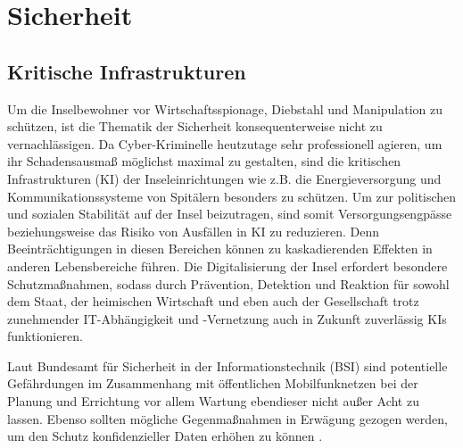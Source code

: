 
%
%
% 
% 
% 

\section{Sicherheit}
\label{sec:sicherheit}
\subsection{Kritische Infrastrukturen}
Um die Inselbewohner vor Wirtschaftsspionage, Diebstahl und Manipulation zu schützen, ist die Thematik der Sicherheit konsequenterweise nicht zu vernachlässigen. Da Cyber-Kriminelle heutzutage sehr professionell agieren, um ihr Schadensausmaß möglichst maximal zu gestalten, sind die kritischen Infrastrukturen (KI) der Inseleinrichtungen wie z.B. die Energieversorgung und Kommunikationssysteme von Spitälern besonders zu schützen. Um zur politischen und sozialen Stabilität auf der Insel beizutragen, sind somit Versorgungsengpässe beziehungsweise das Risiko von Ausfällen in KI zu reduzieren. Denn Beeinträchtigungen in diesen Bereichen können zu kaskadierenden Effekten in anderen Lebensbereiche führen. Die Digitalisierung der Insel erfordert besondere Schutzmaßnahmen, sodass durch Prävention, Detektion und Reaktion für sowohl dem Staat, der heimischen Wirtschaft und eben auch der Gesellschaft trotz zunehmender IT-Abhängigkeit und -Vernetzung auch in Zukunft zuverlässig KIs funktionieren\cite{BSI17}.

Laut Bundesamt für Sicherheit in der Informationstechnik (BSI) sind potentielle Gefährdungen im Zusammenhang mit öffentlichen Mobilfunknetzen bei der Planung und Errichtung vor allem Wartung ebendieser nicht außer Acht zu lassen. Ebenso sollten mögliche Gegenmaßnahmen in Erwägung gezogen werden, um den Schutz konfidenzieller Daten erhöhen zu können \cite{Ger08}.
